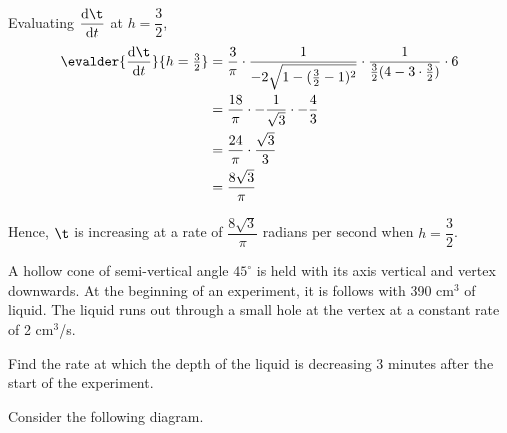 \documentclass{echw}
\begin{document}
            Evaluating $\der{\t}{t}$ at $h = \dfrac32$,
            \begin{align*}
                \evalder{\der{\t}{t}}{h = \tfrac32} &= \dfrac3{\pi} \cdot \dfrac1{-2 \sqrt{1 - (\tfrac32-1)^2}} \cdot \dfrac1{\tfrac32(4-3\cdot\tfrac32)}  \cdot 6\\
                &= \dfrac{18}{\pi} \cdot -\dfrac1{\sqrt{3}} \cdot -\dfrac43\\
                &= \dfrac{24}{\pi} \cdot \dfrac{\sqrt 3}{3}\\
                &= \dfrac{8\sqrt{3}}{\pi}
            \end{align*}

            Hence, $\t$ is increasing at a rate of $\dfrac{8\sqrt3}{\pi}$ radians per second when $h = \dfrac32$.


    \problem{}
        \begin{center}
        \end{center}

         A hollow cone of semi-vertical angle $45^\circ$ is held with its axis vertical and vertex downwards. At the beginning of an experiment, it is follows with 390 cm$^3$ of liquid. The liquid runs out through a small hole at the vertex at a constant rate of 2 cm$^3$/s. 

        Find the rate at which the depth of the liquid is decreasing 3 minutes after the start of the experiment.

    \solution
        Consider the following diagram.
\end{document}
